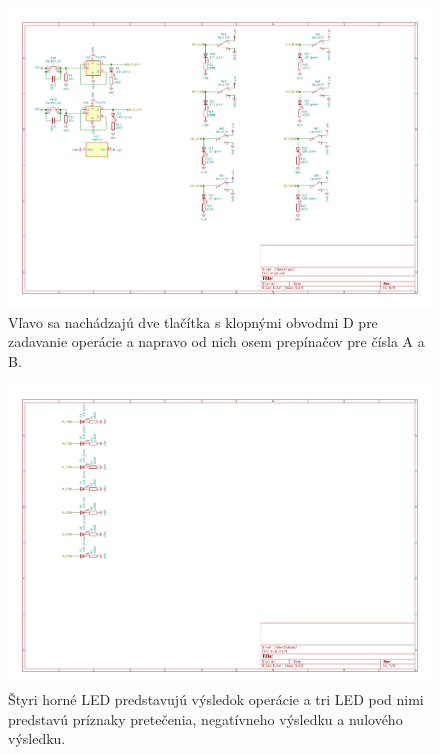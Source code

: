 \documentclass{article}
\begin{document}
    \begin{figure}[h!]
        \centering
        \includegraphics[width=.8\linewidth]{input_sheet.pdf}
        \caption{Vľavo sa nachádzajú dve tlačítka s klopnými obvodmi D pre zadavanie operácie a napravo od nich osem prepínačov pre čísla A a B.}
    \end{figure}

    \begin{figure}[h!]
        \centering
        \includegraphics[width=.8\linewidth]{output_sheet.pdf}
        \caption{Štyri horné LED predstavujú výsledok operácie a tri LED pod nimi predstavú príznaky pretečenia, negatívneho výsledku a nulového výsledku.}
    \end{figure}
\end{document}
